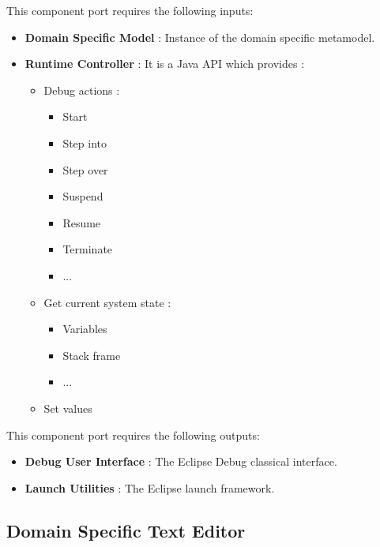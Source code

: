 \documentclass{gemoc} %
\begin{document}
This component port requires the following inputs:
\begin{itemize}
  \item \textbf{Domain Specific Model} :
Instance of the domain specific metamodel.
  \item \textbf{Runtime Controller} :
It is a Java API which provides :
\begin{itemize}
\item Debug actions :
\begin{itemize}
\item Start
\item Step into
\item Step over
\item Suspend
\item Resume
\item Terminate
\item ...
\end{itemize}
\item Get current system state :
\begin{itemize}
\item Variables
\item Stack frame
\item ...
\end{itemize}
\item Set values
\end{itemize}
\end{itemize}

This component port requires the following outputs:
\begin{itemize}
  \item \textbf{Debug User Interface} :
The Eclipse Debug classical interface.
  \item \textbf{Launch Utilities} :
The Eclipse launch framework.
\end{itemize}

\subsection{Domain Specific Text Editor}
\end{document}
